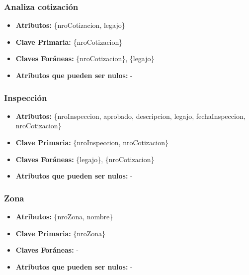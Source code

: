 \documentclass[a4paper,11pt]{article}
\begin{document}
\subsubsection{Analiza cotización}

\begin{itemize}

	\item \textbf{Atributos:} \{nroCotizacion, legajo\}
	
	\item \textbf{Clave Primaria:} \{nroCotizacion\}
	
	\item \textbf{Claves Foráneas:} \{nroCotizacion\}, \{legajo\}

	\item \textbf{Atributos que pueden ser nulos:} -
	
\end{itemize}

\subsubsection{Inspección}

\begin{itemize}

	\item \textbf{Atributos:} \{nroInspeccion, aprobado, descripcion, legajo, fechaInspeccion, nroCotizacion\}
	
	\item \textbf{Clave Primaria:} \{nroInspeccion, nroCotizacion\}
	
	\item \textbf{Claves Foráneas:} \{legajo\}, \{nroCotizacion\}

	\item \textbf{Atributos que pueden ser nulos:} -
	
\end{itemize}

\subsubsection{Zona}

\begin{itemize}

	\item \textbf{Atributos:} \{nroZona, nombre\}
	
	\item \textbf{Clave Primaria:} \{nroZona\}
	
	\item \textbf{Claves Foráneas:} -

	\item \textbf{Atributos que pueden ser nulos:} -
	
\end{itemize}
\end{document}
